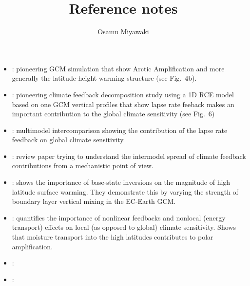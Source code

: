 \documentclass{article}
\title{Reference notes}
\author{Osamu Miyawaki}
\begin{document}
\maketitle

\begin{itemize}
\item \textbf{\cite{manabe1975}}: pioneering GCM simulation that show Arctic Amplification and more generally the latitude-height warming structure (see Fig.~4b).
\item \textbf{\cite{hansen1984}}: pioneering climate feedback decomposition study using a 1D RCE model based on one GCM vertical profiles that show lapse rate feeback makes an important contribution to the global climate sensitivity (see Fig.~6)
\item \textbf{\cite{colman2003}}: multimodel intercomparison showing the contribution of the lapse rate feedback on global climate sensitivity.
\item \textbf{\cite{bony2006}}: review paper trying to understand the intermodel spread of climate feedback contributions from a mechanistic point of view.
\item \textbf{\cite{bintanja2012}}: shows the importance of base-state inversions on the magnitude of high latitude surface warming. They demonstrate this by varying the strength of boundary layer vertical mixing in the EC-Earth GCM.
\item \textbf{\cite{feldl2013}}: quantifies the importance of nonlinear feedbacks and nonlocal (energy transport) effects on local (as opposed to global) climate sensitivity. Shows that moisture transport into the high latitudes contributes to polar amplification.
\item \textbf{\cite{pithan2014}}: 
\item \textbf{\cite{feldl2020}}: 
\end{itemize}



\end{document}
